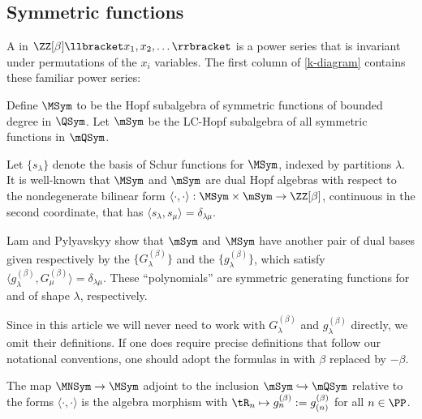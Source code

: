  

\subsection{Symmetric functions}\label{sym-sect}

 A  in $\ZZ[\beta]\llbracket x_1,x_2,\dots\rrbracket $ is a power series 
 that is invariant under permutations of the $x_i$ variables.
The first column of 
 \eqref{k-diagram} contains these familiar  power series:
  
 \begin{definition}
Define $\MSym$ to be the Hopf subalgebra of symmetric functions of bounded degree in $\QSym$.
Let $\mSym$ be the LC-Hopf subalgebra of all symmetric functions in $\mQSym$.
\end{definition}

Let 
$\{s_\lambda\}$ denote the basis of
Schur functions for $\MSym$, indexed by partitions $\lambda$.
It is well-known that $\MSym$ and $\mSym$ are dual Hopf algebras with respect to the nondegenerate bilinear form $\langle\cdot,\cdot\rangle : \MSym \times \mSym \to \ZZ[\beta]$,
 continuous in the second coordinate, that has
$
\langle s_\lambda,s_\mu \rangle = \delta_{\lambda\mu}$.


Lam and Pylyavskyy \cite[Thm.~9.15]{LamPyl} show that $\mSym$ and $\MSym$ have another pair of dual bases given respectively by
 the  $\{G^{(\beta)}_\lambda\}$
and the  $\{g^{(\beta)}_\lambda\}$,
which satisfy $\langle g^{(\beta)}_\lambda, G^{(\beta)}_\mu\rangle =\delta_{\lambda\mu}$.
 These ``polynomials'' are symmetric generating functions for 
 and  of shape $\lambda$, respectively.
 
 Since in this article we will never need to work with $G^{(\beta)}_\lambda$ and $g^{(\beta)}_\lambda$ directly,
 we omit their definitions.
 If one does require precise definitions that follow our notational conventions, one 
should adopt the formulas in \cite[Thm.~4.6]{Yeliussizov2019} with $\beta$ replaced by $-\beta$.


 

\begin{theorem}
\label{sym-dual-thm}
The map $\MNSym \to \MSym$ adjoint to the inclusion
$\mSym \hookrightarrow \mQSym$
relative to the forms 
$\langle\cdot,\cdot\rangle$
 is the algebra morphism
with $\tR_{n} \mapsto g^{(\beta)}_{n} := g^{(\beta)}_{(n)}$ for all $n \in \PP$.
\end{theorem}

